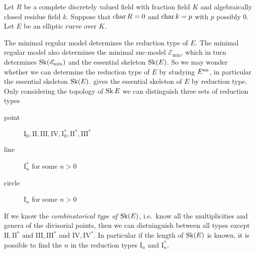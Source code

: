 Let $R$ be a complete discretely valued field with fraction field $K$ and algebraically closed residue field $k$. Suppose that  $\operatorname{char} R = 0$ and $\operatorname{char} k = p$ with $p$ possibly $0$. 
Let $E$ be an elliptic curve over $K$.

The minimal regular model determines the reduction type of $E$. 
The minimal regular model also determines the minimal snc-model $\mathscr E_\text{min} $, which in turn determines $\operatorname{Sk}(\mathscr E_\text{min} )$ and the essential skeleton $\operatorname{Sk}(E)$. 
So we may wonder whether we can determine the reduction type of $E$ by studying $E{}^{\text{an}}$, in particular the essential skeleton $\operatorname{Sk}(E)$.
 gives the essential skeleton of $E$ by reduction type. 
Only considering the topology of $\operatorname{Sk} E$ we can distinguish three sets of reduction types 
\begin{description}
	\item[point] $\mathrm I_0, \mathrm{II}, \mathrm{III},\mathrm{IV}, \mathrm{I}_0^*, \mathrm{II}^*, \mathrm{III}^*$ 
	\item[line] $\mathrm{I}_n^*$ for some $n > 0$
	\item[circle]  $\mathrm{I}_n$ for some  $n > 0$
\end{description}
If we know the \emph{combinatorical type of $\operatorname{Sk}(E)$}, i.e.\ know all the multiplicities and genera of the divisorial points, then we can distuinguish between all types except $\mathrm{II}, \mathrm{II}^*$ and $\mathrm{III}, \mathrm{III}^*$ and  $\mathrm{IV}, \mathrm{IV}^*$.
In particular if the length of $\operatorname{Sk}(E)$ is known, it is possible to find the $n$ in the reduction types $\mathrm I_n$ and $\mathrm I_n^*$. 


